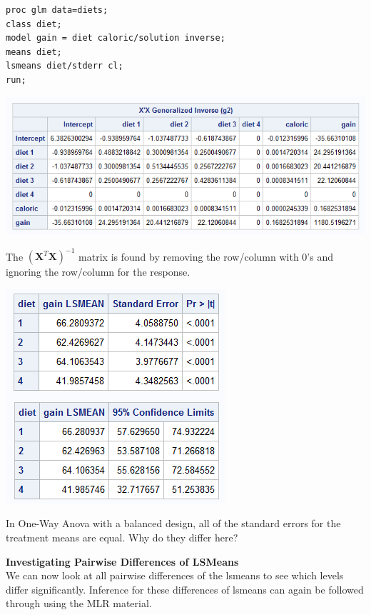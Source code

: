 \begin{small}
\begin{verbatim}
proc glm data=diets;
class diet;
model gain = diet caloric/solution inverse;
means diet;
lsmeans diet/stderr cl;
run;
\end{verbatim}
\end{small}

\begin{center}
\includegraphics[scale=0.75]{DietsInverse}
\end{center}

The $(\textbf{X}^{T}\textbf{X})^{-1}$ matrix is found by removing the row/column with 0's and ignoring the row/column for the response.

\begin{flushleft}
\includegraphics[scale=0.75]{DietsLSMeans}
\end{flushleft}

In One-Way Anova with a balanced design, all of the standard errors for the treatment means are equal.  Why do they differ here?

\newpage

\Large\textbf{Investigating Pairwise Differences of LSMeans}\large\\
We can now look at all pairwise differences of the lsmeans to see which levels differ significantly.  Inference for these differences of lsmeans can again be followed through using the MLR material.\\~\\

